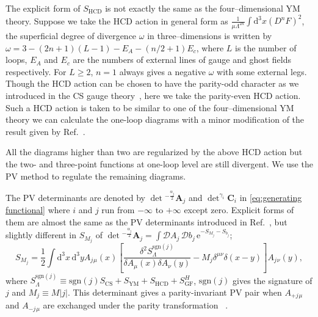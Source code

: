 \documentclass[a4paper,12pt]{article}
\begin{document}
%
The explicit form of $S_\mathrm{HCD}$ is not exactly the same as 
the four--dimensional YM theory.
%
Suppose we take the HCD action in general form as
$\frac{1}{\mu \Lambda^{2n}}\int\mathrm{d}^3x(D^nF)^2$,
the superficial degree of divergence $\omega$
in three--dimensions is written by
$\omega = 3- (2n+1)(L-1)-E_A-(n/2+1)E_c$,
where $L$ is the number of loops, 
$E_A$ and $E_c$ are the numbers of external lines of
gauge and ghost fields respectively.
For $L\ge 2$, $n=1$ always gives a negative $\omega$
with some external legs.
%
Though the HCD action can be chosen to have the parity-odd character
as we introduced in the CS gauge theory~\cite{Nittoh:1998ey},
here we take the parity-even HCD action.
%
Such a HCD action is taken to be similar to
one of the four--dimensional YM theory
we can calculate the one-loop diagrams
with a minor modification of the result given by Ref.~\cite{Nittoh:2000it}.



All the diagrams higher than two are regularized by the above HCD action
but the two- and three-point functions at one-loop level are still divergent.
We use the PV method to regulate the remaining diagrams.

The PV determinants are denoted by
$\det{}^{-\frac{\alpha_{j}}{2}}\mathbf{A}_{j}$ 
and $\det^{\gamma_{i}}\mathbf{C}_{i}$
in \eqref{eq:generating functional}
where $i$ and $j$ run from $-\infty$ to $+\infty$ except zero.
%
Explicit forms of them are almost the same as the PV determinants
introduced in Ref.~\cite{Nittoh:2000it},
but slightly different in $S_{M_j}$ of
$\det{}^{-\frac{\alpha_{j}}{2}}\mathbf{A}_{j}
=\int \mathcal{D}A_j\, \mathcal{D}b_j\,
\mathrm{e}^{-S_{M_{j}} -S_{b_{j}} }$;
\begin{equation}
S_{M_j}=
\frac{1}{2}\int \mathrm{d}^3 x\, \mathrm{d}^3 y
A_j{}_\mu(x)
\left[
 \frac{\delta^2 S_{\Lambda}^{\mathrm{sgn}(j)}}
 {\delta A_\mu(x) \delta A_\nu(y)}
 - M_{j} \delta^{\mu\nu}\delta(x-y)
\right]
A_j{}_\nu(y),
\end{equation}
%
where $S_{\Lambda}^{\mathrm{sgn}(j)} \equiv
\mathrm{sgn}(j) S_\mathrm{CS} + S_\mathrm{YM}
 + S_\mathrm{HCD} + S_\mathrm{GF}^H$,
$\mathrm{sgn}(j)$ gives the signature of $j$
and $M_j\equiv M|j|$.
%
This determinant gives a parity-invariant PV pair
when $A_{+j}{}_\mu$ and $A_{-j}{}_\mu$  are exchanged
under the parity transformation%
~\cite{Nittoh:1998ey}.
\end{document}
